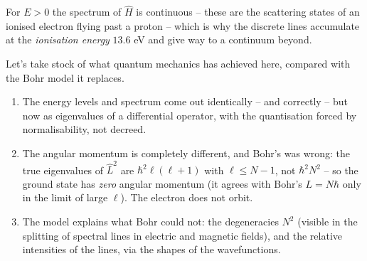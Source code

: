 \documentclass[a4paper]{scrartcl}
\begin{document}
\begin{center}
\end{center}

For $E > 0$ the spectrum of $\hat{H}$ is continuous -- these are the scattering states of an ionised electron flying past a proton -- which is why the discrete lines accumulate at the \emph{ionisation energy} $13.6$ eV and give way to a continuum beyond.

Let's take stock of what quantum mechanics has achieved here, compared with the Bohr model it replaces.
\begin{enumerate}[label=(\roman*)]
    \item The energy levels and spectrum come out identically -- and correctly -- but now as eigenvalues of a differential operator, with the quantisation forced by normalisability, not decreed.
    \item The angular momentum is completely different, and Bohr's was wrong: the true eigenvalues of $\hat{L}^2$ are $\hbar^2 \ell(\ell+1)$ with $\ell \leq N - 1$, not $\hbar^2 N^2$ -- so the ground state has \emph{zero} angular momentum (it agrees with Bohr's $L = N\hbar$ only in the limit of large $\ell$). The electron does not orbit.
    \item The model explains what Bohr could not: the degeneracies $N^2$ (visible in the splitting of spectral lines in electric and magnetic fields), and the relative intensities of the lines, via the shapes of the wavefunctions.
\end{enumerate}
\end{document}
